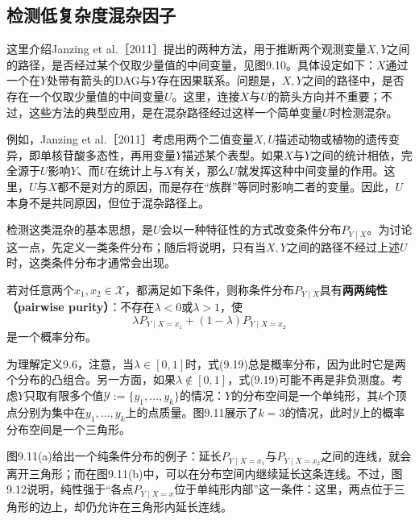 \subsection{检测低复杂度混杂因子}
这里介绍Janzing et al.［2011］提出的两种方法，用于推断两个观测变量$X,Y$之间的路径，是否经过某个仅取少量值的中间变量，见图9.10。具体设定如下：$X$通过一个在$Y$处带有箭头的DAG与$Y$存在因果联系。问题是，$X,Y$之间的路径中，是否存在一个仅取少量值的中间变量$U$。这里，连接$X$与$U$的箭头方向并不重要；不过，这些方法的典型应用，是在混杂路径经过这样一个简单变量$U$时检测混杂。


例如，Janzing et al.［2011］考虑用两个二值变量$X,U$描述动物或植物的遗传变异，即单核苷酸多态性，再用变量$Y$描述某个表型。如果$X$与$Y$之间的统计相依，完全源于$U$影响$Y$、而$U$在统计上与$X$有关，那么$U$就发挥这种中间变量的作用。这里，$U$与$X$都不是对方的原因，而是存在“族群”等同时影响二者的变量。因此，$U$本身不是共同原因，但位于混杂路径上。

检测这类混杂的基本思想，是$U$会以一种特征性的方式改变条件分布$P_{Y\mid X}$。为讨论这一点，先定义一类条件分布；随后将说明，只有当$X,Y$之间的路径不经过上述$U$时，这类条件分布才通常会出现。

\begin{definition}[两两纯条件分布]
若对任意两个$x_1,x_2\in\mathcal X$，都满足如下条件，则称条件分布$P_{Y\mid X}$具有\textbf{两两纯性（pairwise purity）}：不存在$\lambda<0$或$\lambda>1$，使
\begin{equation}
 \lambda P_{Y\mid X=x_1}+(1-\lambda)P_{Y\mid X=x_2}
 \tag{9.19}
\end{equation}
是一个概率分布。
\end{definition}

为理解定义9.6，注意，当$\lambda\in[0,1]$时，式(9.19)总是概率分布，因为此时它是两个分布的凸组合。另一方面，如果$\lambda\notin[0,1]$，式(9.19)可能不再是非负测度。考虑$Y$只取有限多个值$\mathcal Y:=\{y_1,\ldots,y_k\}$的情况：$Y$的分布空间是一个单纯形，其$k$个顶点分别为集中在$y_1,\ldots,y_k$上的点质量。图9.11展示了$k=3$的情况，此时$\mathcal Y$上的概率分布空间是一个三角形。


图9.11(a)给出一个纯条件分布的例子：延长$P_{Y\mid X=x_1}$与$P_{Y\mid X=x_2}$之间的连线，就会离开三角形；而在图9.11(b)中，可以在分布空间内继续延长这条连线。不过，图9.12说明，纯性强于“各点$P_{Y\mid X=x}$位于单纯形内部”这一条件：这里，两点位于三角形的边上，却仍允许在三角形内延长连线。


